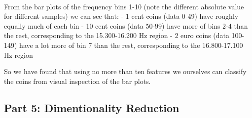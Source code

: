 \documentclass[11pt]{article}
\begin{document}
    \begin{center}
    \end{center}
    { \hspace*{\fill} \\}
    
    From the bar plots of the frequency bins 1-10 (note the different
absolute value for different samples) we can see that: - 1 cent coins
(data 0-49) have roughly equally much of each bin - 10 cent coins (data
50-99) have more of bins 2-4 than the rest, corresponding to the
15.300-16.200 Hz region - 2 euro coins (data 100-149) have a lot more of
bin 7 than the rest, corresponding to the 16.800-17.100 Hz region

So we have found that using no more than ten features we ourselves can
classify the coins from visual inspection of the bar plots.

    \subsection{Part 5: Dimentionality
Reduction}\label{part-5-dimentionality-reduction}
\end{document}
